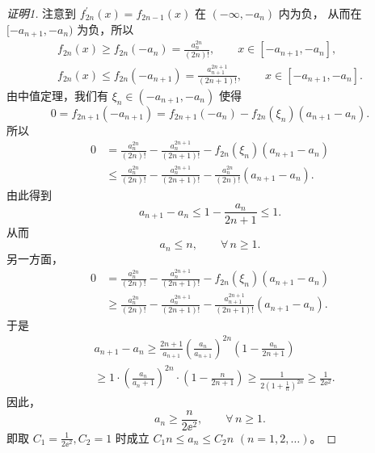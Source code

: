 \begin{quizb}
\begin{enumerate}
\begin{proof}[证明1]
注意到 $f_{2n}^{\prime}(x)=f_{2n-1}(x)$ 在 $(-\infty,-a_{n})$ 内为负，
从而在 $[-a_{n+1},-a_{n})$ 为负，所以
$$\begin{gathered}
f_{2n}(x) \geqslant f_{2n}(-a_{n})=\frac{a_{n}^{2n}}{(2n)!}, \qquad x \in [-a_{n+1},-a_{n}], \\
f_{2n}(x) \leqslant f_{2n}(-a_{n+1})=\frac{a_{n+1}^{2n+1}}{(2n+1)!}, \qquad x \in [-a_{n+1},-a_{n}].
\end{gathered}$$
由中值定理，我们有 $\xi_{n} \in (-a_{n+1},-a_{n})$ 使得
$$0=f_{2n+1}(-a_{n+1})=f_{2n+1}(-a_{n})-f_{2n}(\xi_{n})(a_{n+1}-a_{n}).$$
所以
\begin{align*}
0 & =\frac{a_{n}^{2n}}{(2n)!}-\frac{a_{n}^{2n+1}}{(2n+1)!}-f_{2n}(\xi_{n})(a_{n+1}-a_{n}) \\
& \leqslant \frac{a_{n}^{2n}}{(2n)!}-\frac{a_{n}^{2n+1}}{(2n+1)!}-\frac{a_{n}^{2n}}{(2n)!}(a_{n+1}-a_{n}).
\end{align*}
由此得到
$$a_{n+1}-a_{n} \leqslant 1-\frac{a_{n}}{2n+1} \leqslant 1.$$
从而
$$a_{n} \leqslant n, \qquad \forall\, n \geqslant 1.$$
另一方面，
\begin{align*}
0 & =\frac{a_{n}^{2n}}{(2n)!}-\frac{a_{n}^{2n+1}}{(2n+1)!}-f_{2n}(\xi_{n})(a_{n+1}-a_{n}) \\
& \geqslant \frac{a_{n}^{2n}}{(2n)!}-\frac{a_{n}^{2n+1}}{(2n+1)!}-\frac{a_{n+1}^{2n+1}}{(2n+1)!}(a_{n+1}-a_{n}).
\end{align*}
于是
\begin{align*}
& a_{n+1}-a_{n} \geqslant \frac{2n+1}{a_{n+1}}\left(\frac{a_{n}}{a_{n+1}}\right)^{2n}\left(1-\frac{a_{n}}{2n+1}\right) \\
& \geqslant 1 \cdot\left(\frac{a_{n}}{a_{n}+1}\right)^{2n} \cdot\left(1-\frac{n}{2n+1}\right) 
\geqslant \frac{1}{2\left(1+\frac{1}{n}\right)^{2n}} \geqslant \frac{1}{2\ee^{2}}.
\end{align*}
因此，
$$a_{n} \geqslant \frac{n}{2\ee^{2}}, \qquad \forall\, n \geqslant 1.$$
即取 \(C_{1}=\frac{1}{2\ee^{2}}, C_{2}=1\) 时成立 $C_{1} n \leqslant a_{n} \leqslant C_{2} n$ $(n=1,2, \ldots)$。


\end{proof}
\end{enumerate}
\end{quizb}
